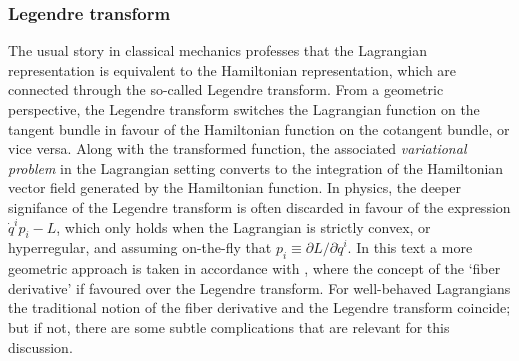 \subsubsection{Legendre transform}
\label{sssec:mendel_legendre}
The usual story in classical mechanics professes that the Lagrangian representation is equivalent to the Hamiltonian representation, which are connected through the so-called Legendre transform. From a geometric perspective, the Legendre transform switches the Lagrangian function on the tangent bundle in favour of the Hamiltonian function on the cotangent bundle, or vice versa. Along with the transformed function, the associated \emph{variational problem} in the Lagrangian setting converts to the integration of the Hamiltonian vector field generated by the Hamiltonian function. In physics, the deeper signifance of the Legendre transform is often discarded in favour of the expression $\dot{q}^ip_i - L$, which only holds when the Lagrangian is strictly convex, or hyperregular, and assuming on-the-fly that $p_i \equiv \partial L/\partial\dot{q}^i$. In this text a more geometric approach is taken in accordance with \citet{Abraham1978}, where the concept of the `fiber derivative' if favoured over the Legendre transform. For well-behaved Lagrangians the traditional notion of the fiber derivative and the Legendre transform coincide; but if not, there are some subtle complications that are relevant for this discussion. 

